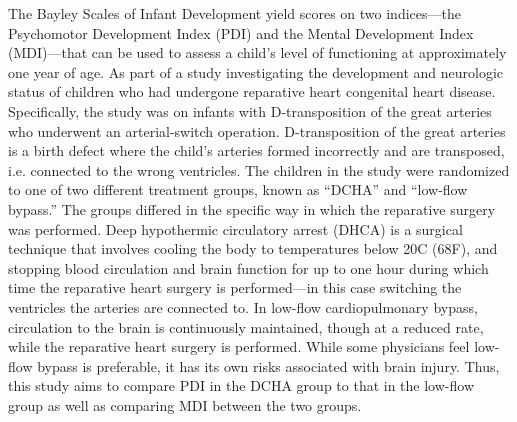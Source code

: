 \documentclass{article}
\begin{document}
\begin{enumerate}
		The Bayley Scales of Infant Development yield scores on two indices---the Psychomotor Development Index (PDI) and the Mental Development Index (MDI)---that can be used to assess a child's level of functioning at approximately one year of age. As part of a study investigating the development and neurologic status of children who had undergone reparative heart congenital heart disease. Specifically, the study was on infants with D-transposition of the great arteries who underwent an arterial-switch operation. D-transposition of the great arteries is a birth defect where the child's arteries formed incorrectly and are transposed, i.e. connected to the wrong ventricles. The children in the study were randomized to one of two different treatment groups, known as ``DCHA'' and ``low-flow bypass.'' The groups differed in the specific way in which the reparative surgery was performed. Deep hypothermic circulatory arrest (DHCA) is a surgical technique that involves cooling the body to temperatures below 20\degree C (68\degree F), and stopping blood circulation and brain function for up to one hour during which time the reparative heart surgery is performed---in this case switching the ventricles the arteries are connected to. In low-flow cardiopulmonary bypass, circulation to the brain is continuously maintained, though at a reduced rate, while the reparative heart surgery is performed. While some physicians feel low-flow bypass is preferable, it has its own risks associated with brain injury. Thus, this study aims to compare PDI in the DCHA group to that in the low-flow group as well as comparing MDI between the two groups.
		
	\end{enumerate}
		
\end{document}
